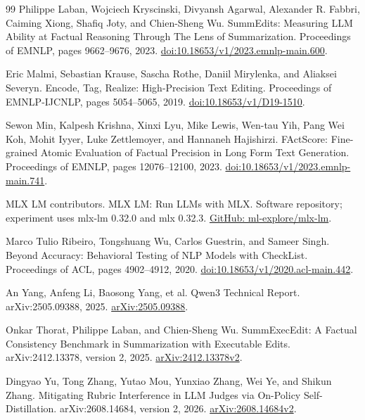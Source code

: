 \documentclass[10pt,letterpaper,twocolumn]{article}
\begin{document}
\begin{thebibliography}{99}
Philippe Laban, Wojciech Kryscinski, Divyansh Agarwal, Alexander R. Fabbri, Caiming Xiong, Shafiq Joty, and Chien-Sheng Wu.
\newblock SummEdits: Measuring LLM Ability at Factual Reasoning Through The Lens of Summarization.
\newblock Proceedings of EMNLP, pages 9662--9676, 2023.
\newblock \href{https://aclanthology.org/2023.emnlp-main.600/}{doi:10.18653/v1/2023.emnlp-main.600}.

Eric Malmi, Sebastian Krause, Sascha Rothe, Daniil Mirylenka, and Aliaksei Severyn.
\newblock Encode, Tag, Realize: High-Precision Text Editing.
\newblock Proceedings of EMNLP-IJCNLP, pages 5054--5065, 2019.
\newblock \href{https://aclanthology.org/D19-1510/}{doi:10.18653/v1/D19-1510}.

Sewon Min, Kalpesh Krishna, Xinxi Lyu, Mike Lewis, Wen-tau Yih, Pang Wei Koh,
Mohit Iyyer, Luke Zettlemoyer, and Hannaneh Hajishirzi.
\newblock FActScore: Fine-grained Atomic Evaluation of Factual Precision in Long Form Text Generation.
\newblock Proceedings of EMNLP, pages 12076--12100, 2023.
\newblock \href{https://aclanthology.org/2023.emnlp-main.741/}{doi:10.18653/v1/2023.emnlp-main.741}.

MLX LM contributors.
\newblock MLX LM: Run LLMs with MLX.
\newblock Software repository; experiment uses mlx-lm 0.32.0 and mlx 0.32.3.
\newblock \href{https://github.com/ml-explore/mlx-lm}{GitHub: ml-explore/mlx-lm}.

Marco Tulio Ribeiro, Tongshuang Wu, Carlos Guestrin, and Sameer Singh.
\newblock Beyond Accuracy: Behavioral Testing of NLP Models with CheckList.
\newblock Proceedings of ACL, pages 4902--4912, 2020.
\newblock \href{https://aclanthology.org/2020.acl-main.442/}{doi:10.18653/v1/2020.acl-main.442}.

An Yang, Anfeng Li, Baosong Yang, et al.
\newblock Qwen3 Technical Report.
\newblock arXiv:2505.09388, 2025.
\newblock \href{https://arxiv.org/abs/2505.09388}{arXiv:2505.09388}.


Onkar Thorat, Philippe Laban, and Chien-Sheng Wu.
\newblock SummExecEdit: A Factual Consistency Benchmark in Summarization with Executable Edits.
\newblock arXiv:2412.13378, version 2, 2025.
\newblock \href{https://arxiv.org/abs/2412.13378v2}{arXiv:2412.13378v2}.

Dingyao Yu, Tong Zhang, Yutao Mou, Yunxiao Zhang, Wei Ye, and Shikun Zhang.
\newblock Mitigating Rubric Interference in LLM Judges via On-Policy Self-Distillation.
\newblock arXiv:2608.14684, version 2, 2026.
\newblock \href{https://arxiv.org/abs/2608.14684v2}{arXiv:2608.14684v2}.


\end{thebibliography}
\end{document}
